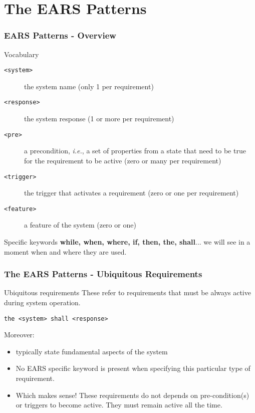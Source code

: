 \documentclass[aspectratio=169]{beamer}
\begin{document}
\section*{The EARS Patterns}
%
%
%
\begin{frame}
  \frametitle{EARS Patterns - Overview}
  \begin{block}{Vocabulary}
    \small
    \begin{description}
      \item [\texttt{<system>}] the system name (only 1 per requirement)
      \item [\texttt{<response>}] the system response (1 or more per requirement)
      \item [\texttt{<pre>}] a precondition, {\em i.e.}, a set of properties from a state that need to be true for the requirement to be active (zero or many per requirement)
      \item [\texttt{<trigger>}] the trigger that activates a requirement (zero or one per requirement)
      \item [\texttt{<feature>}] a feature of the system (zero or one)
    \end{description}
  \end{block}
  \begin{block}{Specific keywords}
  {\bf while, when, where, if, then, the, shall}... we will see in a moment when and where they are used.
  \end{block}

\end{frame}
%
\begin{frame}[fragile]
  \frametitle{The EARS Patterns - Ubiquitous Requirements}
  \begin{block}{Ubiquitous requirements}
    These refer to requirements that must be always active during system operation. 
    \begin{lstlisting}[language=EARS]
                    the <system> shall <response>
    \end{lstlisting}
    Moreover:
    \begin{itemize}
    \item typically state fundamental aspects of the system
    \item No EARS specific keyword is present when specifying this particular type of requirement.
    \item Which makes sense! These requirements do not depends on pre-condition(s) or triggers to become active. They must remain active all the time.
    \end{itemize}
  \end{block}
\end{frame}
\end{document}
